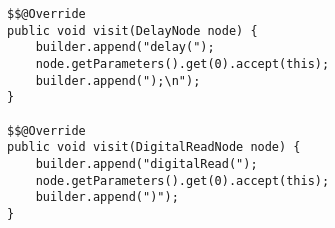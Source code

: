 \begin{lstlisting}[caption={Visit delay node and digital read node in Arduino code generator}, label={io02}]
$$@Override
public void visit(DelayNode node) {
    builder.append("delay(");
    node.getParameters().get(0).accept(this);
    builder.append(");\n");
}

$$@Override
public void visit(DigitalReadNode node) {
    builder.append("digitalRead(");
    node.getParameters().get(0).accept(this);
    builder.append(")");
}
\end{lstlisting}
